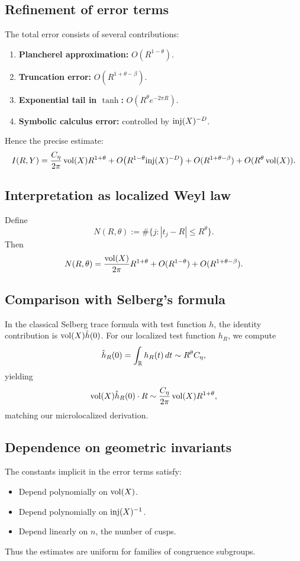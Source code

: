 \subsection{Refinement of error terms}\label{subsec:identity-refine}

The total error consists of several contributions:

\begin{enumerate}
\item \textbf{Plancherel approximation:} $O(R^{1-\theta})$.
\item \textbf{Truncation error:} $O(R^{1+\theta-\beta})$.
\item \textbf{Exponential tail in $\tanh$:} $O(R^\theta e^{-2\pi R})$.
\item \textbf{Symbolic calculus error:} controlled by $\mathrm{inj}(X)^{-D}$.
\end{enumerate}

Hence the precise estimate:
\[
I(R,Y) = \frac{C_\eta}{2\pi}\operatorname{vol}(X)R^{1+\theta} + O\!\left(R^{1-\theta}\mathrm{inj}(X)^{-D}\right) + O(R^{1+\theta-\beta}) + O(R^\theta\operatorname{vol}(X)).
\]

\subsection{Interpretation as localized Weyl law}\label{subsec:identity-interpret}

Define
\[
N(R,\theta) := \#\{ j : |t_j-R|\le R^\theta \}.
\]
Then
\[
N(R,\theta) = \frac{\operatorname{vol}(X)}{2\pi}R^{1+\theta} + O(R^{1-\theta}) + O(R^{1+\theta-\beta}).
\]

\subsection{Comparison with Selberg’s formula}\label{subsec:identity-compare}

In the classical Selberg trace formula with test function $h$, the identity contribution is $\operatorname{vol}(X)\hat h(0)$. For our localized test function $h_R$, we compute
\[
\hat h_R(0) = \int_{\mathbb{R}} h_R(t)\,dt \sim R^\theta C_\eta,
\]
yielding
\[
\operatorname{vol}(X)\hat h_R(0)\cdot R \sim \frac{C_\eta}{2\pi}\operatorname{vol}(X)R^{1+\theta},
\]
matching our microlocalized derivation.

\subsection{Dependence on geometric invariants}\label{subsec:identity-geom}

The constants implicit in the error terms satisfy:
\begin{itemize}
\item Depend polynomially on $\operatorname{vol}(X)$.
\item Depend polynomially on $\mathrm{inj}(X)^{-1}$.
\item Depend linearly on $n$, the number of cusps.
\end{itemize}
Thus the estimates are uniform for families of congruence subgroups.

